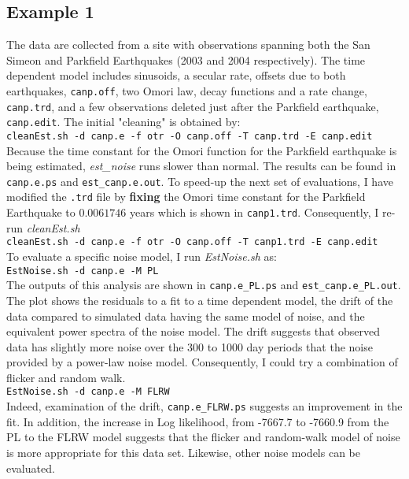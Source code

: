 \documentclass[12pt]{amsart}
\begin{document}
\subsection{Example 1}

The data are collected from a site with observations spanning both the San Simeon and Parkfield  Earthquakes (2003 and 2004
respectively). The time dependent model includes sinusoids, a secular rate, offsets due to both earthquakes, \texttt{canp.off},
two Omori law, decay functions and a rate change, \texttt{canp.trd}, and a few observations deleted just after the Parkfield
earthquake, \texttt{canp.edit}.  The initial "cleaning" is obtained by:
\\
\texttt{cleanEst.sh -d canp.e -f otr -O canp.off -T canp.trd -E canp.edit}
\\

Because the time constant for the Omori function for the Parkfield earthquake is being estimated, \textit{est\_noise} runs
slower than normal.  The results can be found in \texttt{canp.e.ps} and \texttt{est\_canp.e.out}.  To speed-up the
next set of evaluations, I have modified the \texttt{.trd} file by \textbf{fixing} the Omori time constant for the Parkfield
Earthquake to $0.0061746$ years which is shown in \texttt{canp1.trd}. Consequently, I re-run \textit{cleanEst.sh}
\\
\texttt{cleanEst.sh -d canp.e -f otr -O canp.off -T canp1.trd -E canp.edit}
\\

To evaluate a specific noise model, I run \textit{EstNoise.sh} as:
\\
\texttt{EstNoise.sh -d canp.e  -M PL}
\\
The outputs of this analysis are shown in  \texttt{canp.e\_PL.ps} and \texttt{est\_canp.e\_PL.out}.  The plot shows the
residuals to a fit to a time dependent model, the drift of the data compared to simulated data having the same
model of noise, and the equivalent power spectra of the noise model.  The drift suggests that observed data has slightly
more noise over the 300 to 1000 day periods that the noise provided by a power-law noise model.  Consequently, I could try a combination of flicker and random walk.
\\
\texttt{EstNoise.sh -d canp.e  -M FLRW}
\\
Indeed, examination of the drift, \texttt{canp.e\_FLRW.ps} suggests an improvement in the fit. In addition, the increase
in Log likelihood, from -7667.7 to -7660.9 from the PL to the FLRW model suggests that the flicker and random-walk 
model of noise is more appropriate for this data set.
Likewise, other noise models can be evaluated. 
\end{document}
